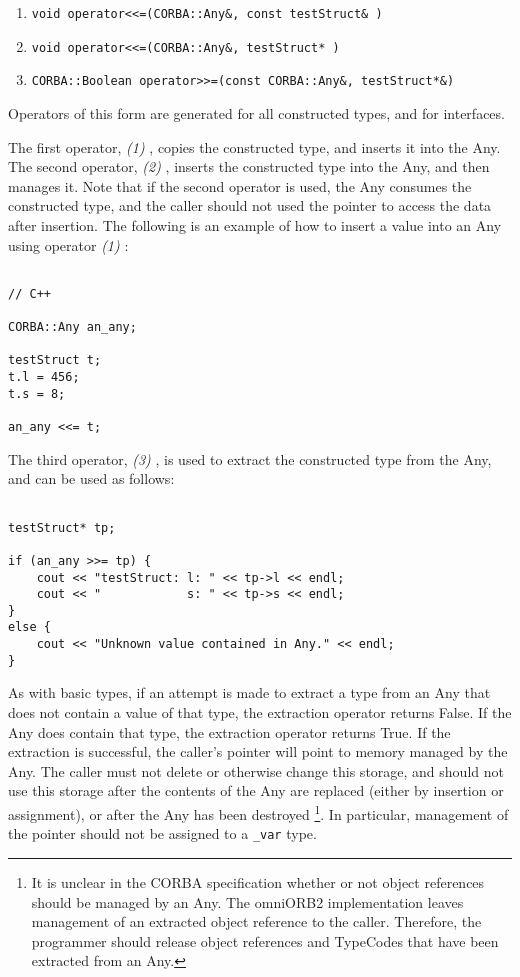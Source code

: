 \documentclass[11pt,twoside,onecolumn]{book}
\begin{document}
\begin{enumerate}
\item {\tt void operator<<=(CORBA::Any\&, const testStruct\& ) }
\item {\tt void operator<<=(CORBA::Any\&, testStruct* ) }
\item {\tt CORBA::Boolean operator>>=(const CORBA::Any\&, testStruct*\&) }
\end{enumerate}

Operators of this form are generated for all constructed types, and for 
interfaces.

The first operator, {\em (1) }, copies the constructed type, and inserts it 
into the Any. The second operator, {\em (2) }, inserts the constructed type 
into the Any, and then manages it. Note that if the second operator is used,
the Any consumes the constructed type, and the caller should not used the
pointer to access the data after insertion. The following is an example of how
to insert a value into an Any using operator {\em (1) }:
{\small
\begin{verbatim}

// C++

CORBA::Any an_any;

testStruct t;
t.l = 456;
t.s = 8;

an_any <<= t;

\end{verbatim}
}


The third operator, {\em (3) }, is used to extract the constructed type 
from the Any, and can be used as follows:

{\small
\begin{verbatim}

testStruct* tp;

if (an_any >>= tp) {
    cout << "testStruct: l: " << tp->l << endl;
    cout << "            s: " << tp->s << endl;
}
else {
    cout << "Unknown value contained in Any." << endl;
}

\end{verbatim}
}

As with basic types, if an attempt is made to extract a type
from an Any that does not contain a value of that type, the extraction 
operator returns False. If the Any does contain that type, the extraction
operator returns True. If the extraction is successful, the caller's pointer 
will point to memory managed by the Any. The caller must not delete or 
otherwise change this storage, and should not use this storage after the
contents of the Any are replaced (either by insertion or assignment), or
after the Any has been destroyed \footnote{It is unclear in the CORBA 
specification whether or not object references should be managed by an Any. 
The omniORB2 implementation leaves management of an extracted object reference
to the caller. Therefore, the programmer should release object references and 
TypeCodes that have been extracted from an Any.}. In particular, management of
the pointer should not be assigned to a {\tt \_var} type.
\end{document}
